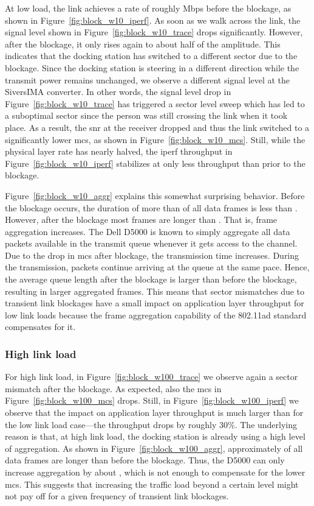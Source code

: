 \documentclass{article}
\begin{document}
At low load, the link achieves a rate of roughly  Mbps before the blockage, as shown in Figure~\ref{fig:block_w10_iperf}. As soon as we walk across the link, the signal level shown in Figure~\ref{fig:block_w10_trace} drops significantly. However, after the blockage, it only rises again to about half of the amplitude. This indicates that the docking station has switched to a different sector due to the blockage. Since the docking station is steering in a different direction while the transmit power remains unchanged, we observe a different signal level at the SiversIMA converter. In other words, the signal level drop in Figure~\ref{fig:block_w10_trace} has triggered a sector level sweep which has led to a suboptimal sector since the person was still crossing the link when it took place. As a result, the \ac{snr} at the receiver dropped and thus the link switched to a significantly lower \ac{mcs}, as shown in Figure~\ref{fig:block_w10_mcs}. Still, while the physical layer rate has nearly halved, the iperf throughput in Figure~\ref{fig:block_w10_iperf} stabilizes at only  less throughput than prior to the blockage. 

Figure~\ref{fig:block_w10_aggr} explains this somewhat surprising behavior. Before the blockage occurs, the duration of more than  of all data frames is less than . However, after the blockage most frames are longer than . That is, frame aggregation increases. The Dell D5000 is known to simply aggregate all data packets available in the transmit queue whenever it gets access to the channel. Due to the drop in \ac{mcs} after blockage, the transmission time increases. During the transmission, packets continue arriving at the queue at the same pace. Hence, the average queue length after the blockage is larger than before the blockage, resulting in larger aggregated frames. This means that sector mismatches due to transient link blockages have a small impact on application layer throughput for low link loads because the frame aggregation capability of the 802.11ad standard compensates for it.

\subsubsection{High link load}
\label{subsubsec:obs_high_load}

For high link load, in Figure~\ref{fig:block_w100_trace} we observe again a sector mismatch after the blockage. As expected, also the \ac{mcs} in Figure~\ref{fig:block_w100_mcs} drops. Still, in Figure~\ref{fig:block_w100_iperf} we observe that the impact on application layer throughput is much larger than for the low link load case---the throughput drops by roughly 30\%. The underlying reason is that, at high link load, the docking station is already using a high level of aggregation. As shown in Figure~\ref{fig:block_w100_aggr}, approximately  of all data frames are longer than  before the blockage. Thus, the D5000 can only increase aggregation by about , which is not enough to compensate for the lower \ac{mcs}. This suggests that increasing the traffic load beyond a certain level might not pay off for a given frequency of transient link blockages.
\end{document}
